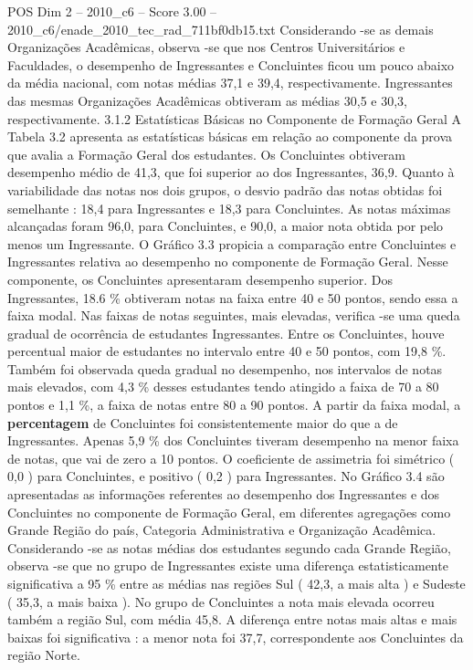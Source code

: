 \begin{textsample}{POS Dim 2 – 2010\_c6 – Score 3.00 – 2010\_c6/enade\_2010\_tec\_rad\_711bf0db15.txt}
Considerando -se as demais Organizações Acadêmicas, observa -se que nos Centros Universitários e Faculdades, o desempenho de Ingressantes e Concluintes ficou um pouco abaixo da média nacional, com notas médias 37,1 e 39,4, respectivamente.
Ingressantes das mesmas Organizações Acadêmicas obtiveram as médias 30,5 e 30,3, respectivamente. 3.1.2 Estatísticas Básicas no Componente de Formação Geral A Tabela 3.2 apresenta as estatísticas básicas em relação ao componente da prova que avalia a Formação Geral dos estudantes.
Os Concluintes obtiveram desempenho médio de 41,3, que foi superior ao dos Ingressantes, 36,9.
Quanto à variabilidade das notas nos dois grupos, o desvio padrão das notas obtidas foi semelhante : 18,4 para Ingressantes e 18,3 para Concluintes.
As notas máximas alcançadas foram 96,0, para Concluintes, e 90,0, a maior nota obtida por pelo menos um Ingressante.
O Gráfico 3.3 propicia a comparação entre Concluintes e Ingressantes relativa ao desempenho no componente de Formação Geral.
Nesse componente, os Concluintes apresentaram desempenho superior.
Dos Ingressantes, 18.6 \% obtiveram notas na faixa entre 40 e 50 pontos, sendo essa a faixa modal.
Nas faixas de notas seguintes, mais elevadas, verifica -se uma queda gradual de ocorrência de estudantes Ingressantes.
Entre os Concluintes, houve percentual maior de estudantes no intervalo entre 40 e 50 pontos, com 19,8 \%.
Também foi observada queda gradual no desempenho, nos intervalos de notas mais elevados, com 4,3 \% desses estudantes tendo atingido a faixa de 70 a 80 pontos e 1,1 \%, a faixa de notas entre 80 a 90 pontos.
A partir da faixa modal, a \textbf{percentagem} de Concluintes foi consistentemente maior do que a de Ingressantes.
Apenas 5,9 \% dos Concluintes tiveram desempenho na menor faixa de notas, que vai de zero a 10 pontos.
O coeficiente de assimetria foi simétrico ( 0,0 ) para Concluintes, e positivo ( 0,2 ) para Ingressantes.
No Gráfico 3.4 são apresentadas as informações referentes ao desempenho dos Ingressantes e dos Concluintes no componente de Formação Geral, em diferentes agregações como Grande Região do país, Categoria Administrativa e Organização Acadêmica.
Considerando -se as notas médias dos estudantes segundo cada Grande Região, observa -se que no grupo de Ingressantes existe uma diferença estatisticamente significativa a 95 \% entre as médias nas regiões Sul ( 42,3, a mais alta ) e Sudeste ( 35,3, a mais baixa ).
No grupo de Concluintes a nota mais elevada ocorreu também a região Sul, com média 45,8.
A diferença entre notas mais altas e mais baixas foi significativa : a menor nota foi 37,7, correspondente aos Concluintes da região Norte.

\end{textsample}
